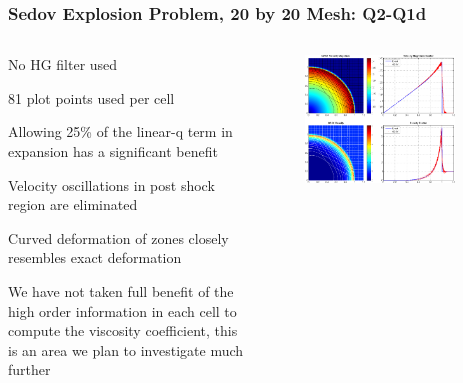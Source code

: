 \documentclass[8pt,xcolor=svgnames]{beamer}
\begin{document}
\begin{frame}
 \frametitle{Sedov Explosion Problem, 20 by 20 Mesh: Q2-Q1d}
 \begin{columns}[T]
  \begin{column}{0.24\textwidth}
  \bigskip
   \begin{itemize}
   \tiny{
    \item No HG filter used
    \item 81 plot points used per cell
    \item Allowing 25\% of the linear-q term in expansion has a significant benefit
    \item Velocity oscillations in post shock region are eliminated
    \item Curved deformation of zones closely resembles exact deformation
    \item We have not taken full benefit of the high order information in each cell to compute the viscosity coefficient, this is an area we plan to investigate much further
    }
   \end{itemize}
  \end{column}
  \begin{column}{0.8\textwidth}
   \begin{figure}[h!]
    \centering
    \includegraphics[width=0.9\textwidth,keepaspectratio=true]{./Images/NewSedov_Q2Q1Mod.png}
    \end{figure}
  \end{column}
 \end{columns}
\end{frame}
\end{document}
